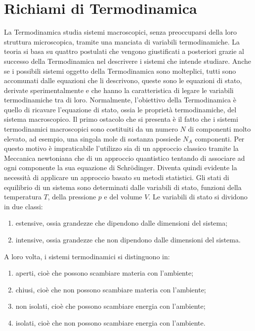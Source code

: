 \chapter{Richiami di Termodinamica}
La Termodinamica studia sistemi macroscopici, senza preoccuparsi della loro struttura microscopica, tramite una manciata di variabili termodinamiche. La teoria si basa su quattro postulati che vengono giustificati a posteriori grazie al successo della Termodinamica nel descrivere i sistemi che intende studiare. Anche se i possibili sistemi oggetto della Termodinamica sono molteplici, tutti sono accomunati dalle equazioni che li descrivono, queste sono le equazioni di stato, derivate sperimentalmente e che hanno la caratteristica di legare le variabili termodinamiche tra di loro. Normalmente, l'obiettivo della Termodinamica è quello di ricavare l'equazione di stato, ossia le proprietà termodinamiche, del sistema macroscopico. Il primo ostacolo che si presenta è il fatto che i sistemi termodinamici macroscopici sono costituiti da un numero $N$ di componenti molto elevato, ad esempio, una singola mole di sostanza possiede $N_A$ componenti. Per questo motivo è impraticabile l'utilizzo sia di un approccio classico tramite la Meccanica newtoniana che di un approccio quantistico tentando di associare ad ogni componente la sua equazione di Schr\"odinger. Diventa quindi evidente la necessità di applicare un approccio basato su metodi statistici. Gli stati di equilibrio di un sistema sono determinati dalle variabili di stato, funzioni della temperatura $T$, della pressione $p$ e del volume $V$. Le variabili di stato si dividono in due classi:
\begin{enumerate}
    \item estensive, ossia grandezze che dipendono dalle dimensioni del sistema;
    \item intensive, ossia grandezze che non dipendono dalle dimensioni del sistema.
\end{enumerate}
A loro volta, i sistemi termodinamici si distinguono in:
\begin{enumerate}
    \item aperti, cioè che possono scambiare materia con l'ambiente;
    \item chiusi, cioè che non possono scambiare materia con l'ambiente;
    \item non isolati, cioè che possono scambiare energia con l'ambiente;
    \item isolati, cioè che non possono scambiare energia con l'ambiente.
\end{enumerate}
